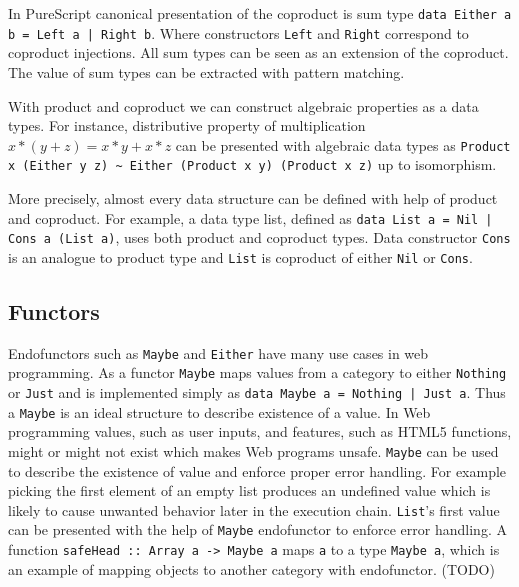 \documentclass[article]{aaltoseries}
\begin{document}
    In PureScript canonical presentation of the coproduct is sum type
    \lstinline{data Either a b = Left a | Right b}. Where constructors
    \lstinline|Left| and \lstinline|Right| correspond to coproduct injections.
    All sum types can be seen as an extension of the coproduct. The value of sum
    types can be extracted with pattern matching.
    
    With product and coproduct we can construct algebraic properties as a data
    types. For instance, distributive property of multiplication $x * (y + z) =
    x * y + x * z$ can be presented with algebraic data types as
    \lstinline|Product x (Either y z) ~ Either (Product x y) (Product x z)| up
    to isomorphism.

    More precisely, almost every data structure can be defined with help of
    product and coproduct. For example, a data type list, defined as
    \lstinline{data List a = Nil | Cons a (List a)}, uses both product and
    coproduct types. Data constructor \lstinline|Cons| is an analogue to product
    type and \lstinline|List| is coproduct of either \lstinline|Nil| or \lstinline|Cons|.

    

  \subsection{Functors}
    Endofunctors such as \lstinline|Maybe| and \lstinline|Either| have many use
    cases in web programming. As a functor \lstinline|Maybe| maps values from a
    category to either \lstinline|Nothing| or \lstinline|Just| and is
    implemented simply as \lstinline{data Maybe a = Nothing | Just a}. Thus a
    \lstinline|Maybe| is an ideal structure to describe existence of a value. In
    Web programming values, such as user inputs, and features, such as HTML5
    functions, might or might not exist which makes Web programs unsafe.
    \lstinline|Maybe| can be used to describe the existence of value and enforce
    proper error handling. For example picking the first element of an empty
    list produces an undefined value which is likely to cause unwanted behavior
    later in the execution chain. \lstinline|List|'s first value can be
    presented with the help of \lstinline|Maybe| endofunctor to enforce error
    handling. A function \lstinline|safeHead :: Array a -> Maybe a| maps
    \lstinline|a| to a type \lstinline|Maybe a|, which is an example of mapping
    objects to another category with endofunctor. (TODO)
\end{document}
